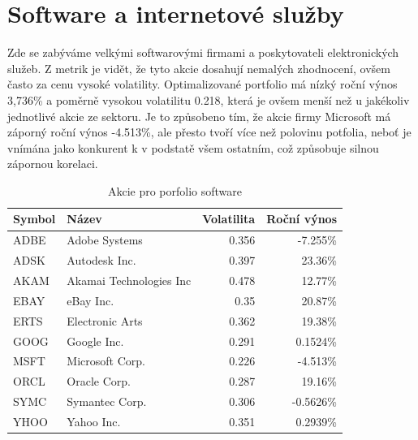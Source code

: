 \documentclass[a4paper,12pt]{report}
\begin{document}
  \section{Software a internetové služby}
    Zde se zabýváme velkými softwarovými firmami a poskytovateli elektronických služeb. Z metrik je vidět, že tyto akcie dosahují nemalých zhodnocení, ovšem často za cenu vysoké volatility. Optimalizované portfolio má nízký roční výnos 3,736\% a poměrně vysokou volatilitu 0.218, která je ovšem menší než u jakékoliv jednotlivé akcie ze sektoru. Je to způsobeno tím, že akcie firmy Microsoft má záporný roční výnos -4.513\%, ale přesto tvoří více než polovinu potfolia, neboť je vnímána jako konkurent k v podstatě všem ostatním, což způsobuje silnou zápornou korelaci. 
    \begin{table}[htb]
      \centering
      \begin{tabular}{|l|l|r|r|}
        \hline
        Symbol&Název&Volatilita&Roční výnos\\\hline\hline
        ADBE&Adobe Systems &0.356&-7.255\%\\\hline
        ADSK&Autodesk Inc. &0.397&23.36\%\\\hline
        AKAM&Akamai Technologies Inc &0.478&12.77\%\\\hline
        EBAY&eBay Inc. &0.35&20.87\%\\\hline
        ERTS&Electronic Arts &0.362&19.38\%\\\hline
        GOOG&Google Inc. &0.291&0.1524\%\\\hline
        MSFT&Microsoft Corp. &0.226&-4.513\%\\\hline
        ORCL&Oracle Corp. &0.287&19.16\%\\\hline
        SYMC&Symantec Corp. &0.306&-0.5626\%\\\hline
        YHOO&Yahoo Inc. &0.351&0.2939\%\\\hline
      \end{tabular}
      \caption{Akcie pro porfolio software}
    \end{table}
\end{document}
